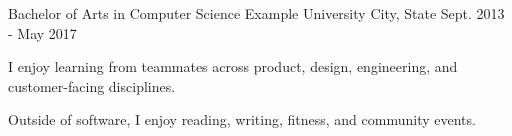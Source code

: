 

\begin{cventries}
  \cventry
  {Bachelor of Arts in Computer Science}
  {Example University}
  {City, State}
  {Sept. 2013 - May 2017}
  {}
  \cventry
  {}
  {}
  {}
  {}
  {
    \vspace{-12mm}
    \begin{cvitems}
      \item {I enjoy learning from teammates across product, design, engineering, and customer-facing disciplines.}
      \item {Outside of software, I enjoy reading, writing, fitness, and community events.}
    \end{cvitems}
  }

\end{cventries}
